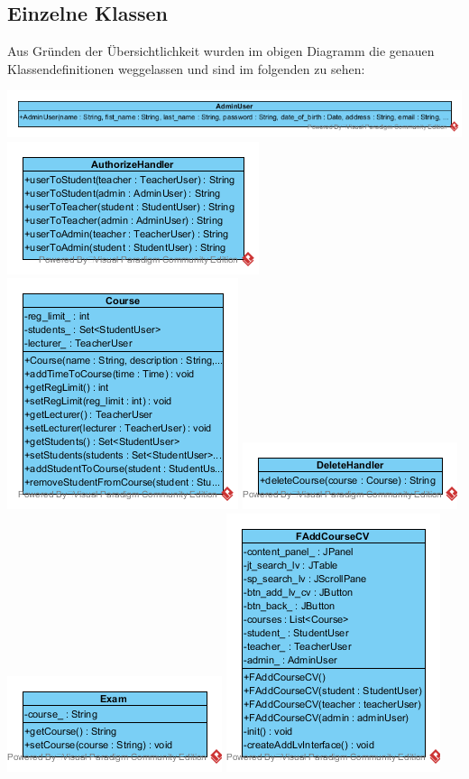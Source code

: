 \documentclass[a4paper,12pt]{article}
\begin{document}
\subsection*{Einzelne Klassen}
Aus Gründen der Übersichtlichkeit wurden im obigen Diagramm die genauen Klassendefinitionen weggelassen und sind im folgenden zu sehen:
\begin{center}
	\includegraphics[scale=.8]{cAdminUser.png}
	\includegraphics[scale=1]{cAuthorizeHandler.png}
	\includegraphics[scale=1]{cCourse.png}
	\includegraphics[scale=1]{cDeleteHandler.png}
	\includegraphics[scale=1]{cExam.png}
	\includegraphics[scale=1]{cFAddCourseCV.png}

\end{center}
\end{document}

